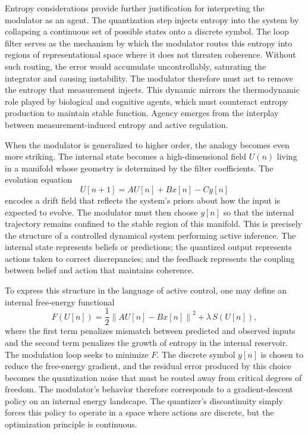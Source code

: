 Entropy considerations provide further justification for interpreting the modulator as an agent. The quantization step injects entropy into the system by collapsing a continuous set of possible states onto a discrete symbol. The loop filter serves as the mechanism by which the modulator routes this entropy into regions of representational space where it does not threaten coherence. Without such routing, the error would accumulate uncontrollably, saturating the integrator and causing instability. The modulator therefore must act to remove the entropy that measurement injects. This dynamic mirrors the thermodynamic role played by biological and cognitive agents, which must counteract entropy production to maintain stable function. Agency emerges from the interplay between measurement-induced entropy and active regulation.

When the modulator is generalized to higher order, the analogy becomes even more striking. The internal state becomes a high-dimensional field \(U(n)\) living in a manifold whose geometry is determined by the filter coefficients. The evolution equation
\[
U[n+1] = A U[n] + B x[n] - C y[n]
\]
encodes a drift field that reflects the system’s priors about how the input is expected to evolve. The modulator must then choose \(y[n]\) so that the internal trajectory remains confined to the stable region of this manifold. This is precisely the structure of a controlled dynamical system performing active inference. The internal state represents beliefs or predictions; the quantized output represents actions taken to correct discrepancies; and the feedback represents the coupling between belief and action that maintains coherence.

To express this structure in the language of active control, one may define an internal free-energy functional
\[
F(U[n]) = \frac{1}{2} \left\| A U[n] - B x[n] \right\|^2 + \lambda \, S(U[n]),
\]
where the first term penalizes mismatch between predicted and observed inputs and the second term penalizes the growth of entropy in the internal reservoir. The modulation loop seeks to minimize \(F\). The discrete symbol \(y[n]\) is chosen to reduce the free-energy gradient, and the residual error produced by this choice becomes the quantization noise that must be routed away from critical degrees of freedom. The modulator’s behavior therefore corresponds to a gradient-descent policy on an internal energy landscape. The quantizer’s discontinuity simply forces this policy to operate in a space where actions are discrete, but the optimization principle is continuous.

